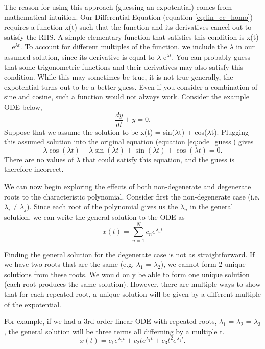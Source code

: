 \documentclass{article}
\newcommand{\be}{\begin{equation}}
\newcommand{\ee}{\end{equation}}
\begin{document}
The reason for using this approach (guessing an expotential) comes from mathematical intuition.
Our Differential Equation (equation \ref{eq:lin_cc_homo}) requires a function x(t) such that the function and its derivatives cancel out to satisfy the RHS.
A simple elementary function that satisfies this condition is x(t) = e$^{\lambda t}$.
To account for different multiples of the function, we include the $\lambda$ in our assumed solution, since its derivative is equal to $\lambda$ e$^{\lambda t}$.
You can probably guess that some trigonometric functions and their derivatives may also satisfy this condition.
While this may sometimes be true, it is not true generally, the expotential turns out to be a better guess. 
Even if you consider a combination of sine and cosine, such a function would not always work.
Consider the example ODE below,
\be \label{eq:ode_guess}
\frac{dy}{dt} + y = 0 .
\ee
Suppose that we assume the solution to be x(t) = sin($\lambda$t) + cos($\lambda$t).
Plugging this assumed solution into the original equation (equation \ref{eq:ode_guess}) gives
\be
\lambda \cos(\lambda t) - \lambda \sin(\lambda t) + \sin(\lambda t) + \cos(\lambda t) = 0 .
\ee
There are no values of $\lambda$ that could satisfy this equation, and the guess is therefore incorrect.

We can now begin exploring the effects of both non-degenerate and degenerate roots to the characteristic polynomial.
Consider first the non-degenerate case (i.e. $\lambda_i \neq \lambda_j$).
Since each root of the polynomial gives us the $\lambda_n$ in the general solution, we can write the general solution to the ODE as
\be
x(t) = \sum_{n=1}^N c_n e^{\lambda_n t}
\ee

Finding the general solution for the degenerate case is not as straightforward.
If we have two roots that are the same (e.g. $\lambda_1$ = $\lambda_2$), we cannot form 2 unique solutions from these roots. 
We would only be able to form one unique solution (each root produces the same solution). 
However, there are multiple ways to show that for each repeated root, a unique solution will be given by a different multiple of the expotential.

For example, if we had a 3rd order linear ODE with repeated roots, $\lambda_1$ = $\lambda_2$ = $\lambda_3$, the general solution will be three terms all differning by a multiple t.
\be
x(t) = c_1 e^{\lambda_1 t} + c_2 t e^{\lambda_1 t} + c_3 t^2 e^{\lambda_1 t} .
\ee
\end{document}
